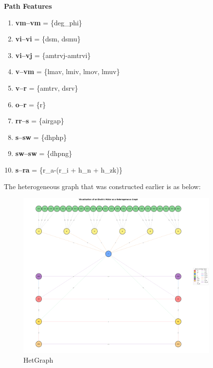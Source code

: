\documentclass{report} %
\begin{document}
\textbf{Path Features}

\begin{enumerate}

    \item \textbf{vm--vm} = \{deg\_phi\}

    \item \textbf{vi--vi} = \{dsm, dsmu\}

    \item \textbf{vi--vj} = \{amtrvj-amtrvi\}

    \item \textbf{v--vm} = \{lmav, lmiv, lmov, lmuv\}

    \item \textbf{v--r} = \{amtrv, dsrv\}
    
    \item \textbf{o--r} = \{r\}

    \item \textbf{rr--s} = \{airgap\}

    \item \textbf{s--sw} = \{dhphp\}
    
    \item \textbf{sw--sw} = \{dhpng\}
    
    \item \textbf{s--ra} = \{r\_a-(r\_i + h\_n + h\_zk)\}
    
\end{enumerate}
The heterogeneous graph that was constructed earlier is as below:
\begin{figure}[h]
    \centering
    \includegraphics[width=0.9\textwidth]{./ReportImages/graph.png} 
    \caption{HetGraph}
    \label{fig:Graph}
\end{figure}
\end{document}
